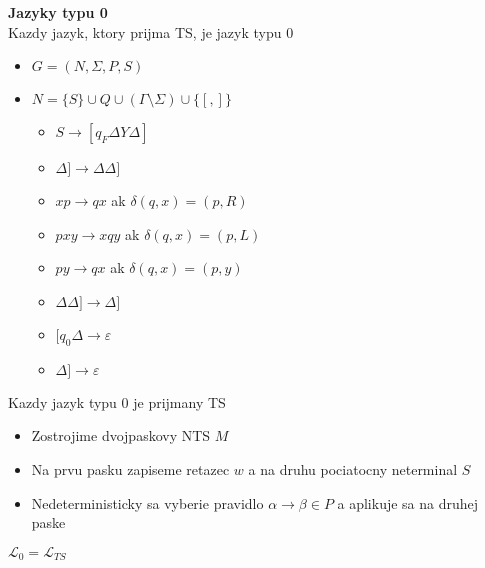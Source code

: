 \documentclass[12pt]{article}
\begin{document}
\textbf{Jazyky typu 0}\\
Kazdy jazyk, ktory prijma TS, je jazyk typu 0
\begin{itemize}
	\item $G = (N,\Sigma,P,S)$
	\item $N = \{S\} \cup Q \cup (\Gamma \setminus \Sigma) \cup \{[,]\}$
	\begin{itemize}
		\item $S \to [q_{F}\Delta Y \Delta]$
		\item $\Delta] \to \Delta\Delta]$
		\item $xp \to qx$ ak $\delta(q,x) = (p,R)$
		\item $pxy \to xqy$ ak $\delta(q,x) = (p,L)$
		\item $py \to qx$ ak $\delta(q,x) = (p,y)$
		\item $\Delta\Delta] \to \Delta]$
		\item $[q_{0}\Delta \to \varepsilon$
		\item $\Delta] \to \varepsilon$
	\end{itemize}
\end{itemize}

Kazdy jazyk typu 0 je prijmany TS
\begin{itemize}
	\item Zostrojime dvojpaskovy NTS $M$
	\item Na prvu pasku zapiseme retazec $w$ a na druhu pociatocny neterminal $S$
	\item Nedeterministicky sa vyberie pravidlo $\alpha \to \beta \in P$ a aplikuje sa na druhej paske
\end{itemize}
$\mathcal{L}_{0} = \mathcal{L}_{TS}$
\end{document}
